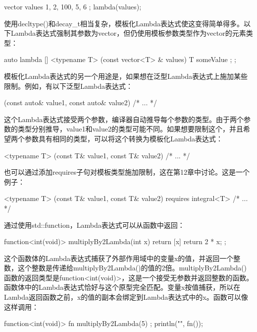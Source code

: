 \begin{cpp}
vector values { 1, 2, 100, 5, 6 };
lambda(values);
\end{cpp}

使用decltype()和decay\_t相当复杂，模板化Lambda表达式使这变得简单得多。以下Lambda表达式强制其参数为vector，但仍使用模板参数类型作为vector的元素类型：

\begin{cpp}
auto lambda { [] <typename T> (const vector<T> & values) {
        T someValue { };
} };
\end{cpp}

模板化Lambda表达式的另一个用途是，如果想在泛型Lambda表达式上施加某些限制。例如，有以下泛型Lambda表达式：

\begin{cpp}
[](const auto& value1, const auto& value2) { /* ... */ }
\end{cpp}

这个Lambda表达式接受两个参数，编译器自动推导每个参数的类型。由于两个参数的类型分别推导，value1和value2的类型可能不同。如果想要限制这个，并且希望两个参数具有相同的类型，可以将这个转换为模板化Lambda表达式：

\begin{cpp}
[] <typename T> (const T& value1, const T& value2) { /* ... */ }
\end{cpp}

也可以通过添加requires子句对模板类型施加限制，这在第12章中讨论。这是一个例子：

\begin{cpp}
[] <typename T> (const T& value1, const T& value2) requires integral<T> {/* ... */}
\end{cpp}


通过使用std::function，Lambda表达式可以从函数中返回：

\begin{cpp}
function<int(void)> multiplyBy2Lambda(int x)
{
    return [x]{ return 2 * x; };
}
\end{cpp}

这个函数体的Lambda表达式捕获了外部作用域中的变量x的值，并返回一个整数，这个整数是传递给multiplyBy2Lambda()的值的2倍。multiplyBy2Lambda()函数的返回类型是function<int(void)>，这是一个接受无参数并返回整数的函数。函数体中的Lambda表达式恰好与这个原型完全匹配。变量x按值捕获，所以在Lambda返回函数之前，x的值的副本会绑定到Lambda表达式中的x。函数可以像这样调用：

\begin{cpp}
function<int(void)> fn { multiplyBy2Lambda(5) };
println("{}", fn());
\end{cpp}


